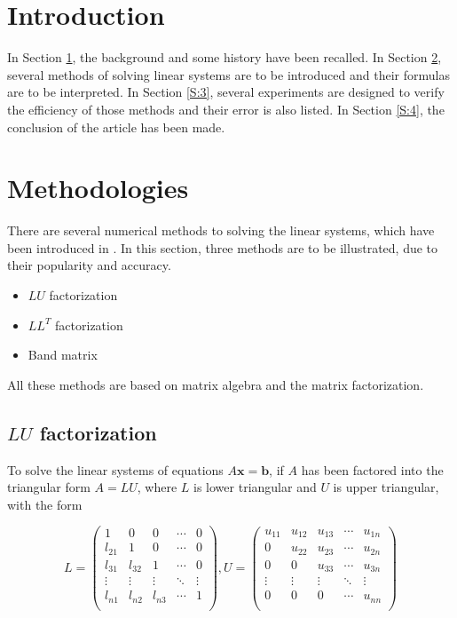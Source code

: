 \documentclass[preprint,12pt]{elsarticle}
\begin{document}
\section{Introduction}
\label{S:1}

In Section \ref{S:1}, the background and some history  have been recalled. In Section \ref{S:2}, several methods of solving linear systems are to be introduced and their formulas are to be interpreted. In Section \ref{S:3}, several experiments are designed to verify the efficiency of those methods and their error is also listed. In Section \ref{S:4}, the conclusion of the article has been made.

\section{Methodologies}
\label{S:2}

There are several numerical methods to solving the linear systems, which have been introduced in \cite{burden:2001na}. In this section, three methods are to be illustrated, due to their popularity and accuracy.

\begin{itemize}
\item $LU$ factorization
\item $LL^T$ factorization
\item Band matrix
\end{itemize}

All these methods are based on matrix algebra and the matrix factorization.

\subsection{$LU$ factorization}
\label{SS:2.1}

To solve the linear systems of equations $A\mathbf{x}=\mathbf{b}$, if $A$ has been factored into the triangular form $A = LU$, where $L$ is lower triangular and $U$ is upper triangular, with the form

\small
\[
L=\left(%
\begin{array}{ccccc}
  1& 0 & 0& \cdots & 0 \\
  l_{21} & 1 & 0 & \cdots& 0 \\
  l_{31} & l_{32} & 1 & \cdots & 0 \\
  \vdots & \vdots & \vdots &\ddots & \vdots \\
  l_{n1} & l_{n2} & l_{n3} & \cdots & 1 \\
\end{array}%
\right),
U=\left(%
\begin{array}{ccccc}
  u_{11} & u_{12} & u_{13}& \cdots & u_{1n} \\
  0 & u_{22} & u_{23} & \cdots& u_{2n} \\
  0 & 0 & u_{33} & \cdots & u_{3n} \\
  \vdots & \vdots & \vdots &\ddots & \vdots \\
  0 & 0 & 0 & \cdots & u_{nn} \\
\end{array}%
\right)
\]
\end{document}
